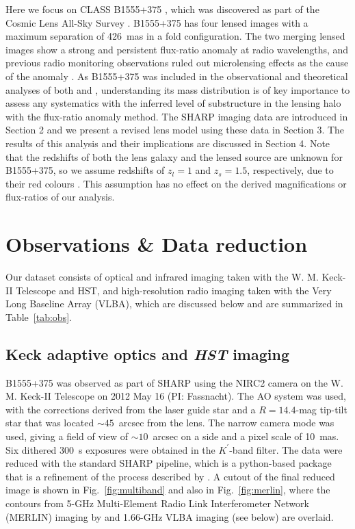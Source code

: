 \documentclass[a4paper,fleqn,usenatbib,useAMS]{mnras}
\begin{document}
Here we focus on CLASS B1555+375 \citep{Marlow99}, which was discovered as part of the Cosmic Lens All-Sky Survey \citep{CLASS1,CLASS2}. B1555+375 has four lensed images with a maximum separation of 426~mas in a fold configuration.  The two merging lensed images show a strong and persistent flux-ratio anomaly at radio wavelengths, and previous radio monitoring observations ruled out microlensing effects as the cause of the anomaly \citep{K03}. As B1555+375 was included in the observational and theoretical analyses of both \citet{Dalal2002} and \citet{Xu15}, understanding its mass distribution is of key importance to assess any systematics with the inferred level of substructure in the lensing halo with the flux-ratio anomaly method. The SHARP imaging data are introduced in Section 2 and we present a revised lens model using these data in Section 3. The results of this analysis and their implications are discussed in Section 4. Note that the redshifts of both the lens galaxy and the lensed source are unknown for B1555+375, so we assume redshifts of $z_l = 1$ and $z_s = 1.5$, respectively, due to their red colours \citep{Marlow99}. This assumption has no effect on the derived magnifications or flux-ratios of our analysis.

\section{Observations \& Data reduction}

Our dataset consists of optical and infrared imaging taken with the W. M. Keck-II Telescope and HST, and high-resolution radio imaging taken with the Very Long Baseline Array (VLBA), which are discussed below and are summarized in Table~\ref{tab:obs}.

\subsection{Keck adaptive optics and {\it HST} imaging}

B1555+375 was observed as part of SHARP using the NIRC2 camera on the W. M. Keck-II Telescope on 2012 May 16 (PI: Fassnacht).  The AO system was used, with the corrections derived from the laser guide star and a $R=14.4$-mag tip-tilt star that was located $\sim45$~arcsec from the lens.  The narrow camera mode was used, giving a field of view of $\sim10$~arcsec on a side and a pixel scale of 10~mas. Six dithered 300~s exposures were obtained in the $K^{\prime}$-band filter.  The data were reduced with the standard SHARP pipeline, which is a python-based package that is a refinement of the process described by \citet{Auger_EELS1}.  A cutout of the final reduced image is shown in Fig.~\ref{fig:multiband} and also in Fig.~\ref{fig:merlin}, where the contours from 5-GHz Multi-Element Radio Link Interferometer Network (MERLIN) imaging by \citet{Marlow99} and 1.66-GHz VLBA imaging (see below) are overlaid.
\end{document}
